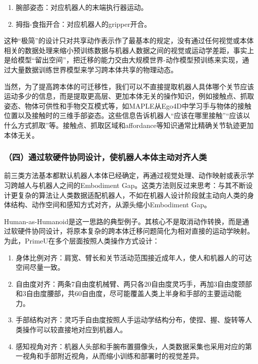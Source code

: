 \begin{enumerate}
\def\labelenumi{\arabic{enumi}.}
\item
  腕部姿态：对应机器人的末端执行器运动。
\item
  拇指-食指开合：对应机器人的gripper开合。
\end{enumerate}

这种``极简''的设计只对共享动作表示作了最基本的规定，没有通过任何视觉或本体相关的数据处理来缩小预训练数据与机器人数据之间的视觉或运动学差距，事实上是给模型``留出空间''，把迁移的能力交由大规模世界-动作模型预训练来实现，通过大量数据训练世界模型来学习跨本体共享的物理动态。

当然，为了提高跨本体的可迁移性，我们可以不直接提取机器人具体哪个关节应该运动多少的信息，而是提取更高层、更加本体无关的操作知识，例如接触点、抓取姿态、物体可供性和手物交互模式等，如MAPLE从Ego4D中学习手与物体的接触位置以及接触时的三维手部姿态。这些信息告诉机器人``应该在哪里接触''``应该以什么方式抓取''等。接触点、抓取区域和affordance等知识通常比精确关节轨迹更加本体无关。

\hypertarget{ux56dbux901aux8fc7ux8f6fux786cux4ef6ux534fux540cux8bbeux8ba1ux4f7fux673aux5668ux4ebaux672cux4f53ux4e3bux52a8ux5bf9ux9f50ux4ebaux7c7b}{%
\subsubsection{（四）通过软硬件协同设计，使机器人本体主动对齐人类}\label{ux56dbux901aux8fc7ux8f6fux786cux4ef6ux534fux540cux8bbeux8ba1ux4f7fux673aux5668ux4ebaux672cux4f53ux4e3bux52a8ux5bf9ux9f50ux4ebaux7c7b}}

前三类方法基本都默认机器人本体已经确定，再通过视觉处理、动作映射或表示学习跨越人与机器人之间的Embodiment Gap。这类方法则反过来思考：与其不断设计更复杂的算法让人类数据适配机器人，不如在机器人设计阶段就主动向人类的身体结构、动作空间和感知方式对齐，从源头缩小Embodiment Gap。

Human-as-Humanoid是这一思路的典型例子。其核心不是取消动作转换，而是通过软硬件协同设计，将原本复杂的跨本体迁移问题简化为相对直接的运动学映射。为此，PrimeU在多个层面按照人类操作方式设计：

\begin{enumerate}
\def\labelenumi{\arabic{enumi}.}
\item
  身体比例对齐：肩宽、臂长和关节活动范围接近成年人，使人和机器人的可达空间尽量一致。
\item
  自由度对齐：两条7自由度机械臂、两只各20自由度灵巧手，再加3自由度颈部和3自由度腰部，共60自由度，尽可能覆盖人类上半身和手部的主要运动能力。
\item
  手部结构对齐：灵巧手自由度按照人手运动学结构分布，使捏、握、旋转等人类操作可以较直接地对应到机器人。
\item
  感知视角对齐：机器人头部和手腕布置摄像头，人类数据采集也采用对应的第一视角和手部附近视角，从而缩小训练和部署时的视觉差异。
\end{enumerate}

